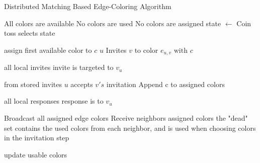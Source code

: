 \begin{algorithm}
\caption{Distributed Matching Based Edge-Coloring Algorithm}
\begin{algorithmic}[1]
 \Comment All colors are available \label{alglin:ec-init-color}
 \Comment No colors are used \label{alglin:ec-init-dict}
 \Comment No colors are assigned
\State state $\leftarrow$ \cCd
\Repeat
{}
 \Comment Coin toss selects state

\label{alglin:ec-issue-invite}
 \Comment assign first available color to $c$ \label{alglin:ec-select-color}
 \Comment $u$ Invites $v$ to color $e_{u,v} \text{ with } c$ 

 \Comment all local invites
 \Comment invite is targeted to $v_u$
\EndIf
{}

 \Comment from stored invites \label{alglin:ec-choose-invite}
 \Comment $u$ accepts $v's$ invitation
 \Comment Append c to assigned colors \label{alglin:ec-assign1}

\label{alglin:ec-receive-responses}
 \Comment all local responses
 \Comment response is to $v_u$ 
\EndIf
{}

 \Comment Broadcast all assigned edge colors
 \Comment Receive neighbors assigned colors
  \Comment the "dead" set contains the used colors from each neighbor, and is used when choosing colors in the invitation step \label{alglin:ec-assign2}

 \Comment update usable colors \label{alglin:ec-update-colors}

\EndIf
{}\label{alglin:ec-end-while}
\EndFor
\end{algorithmic}
\label{alg:edge-color}
\end{algorithm}

